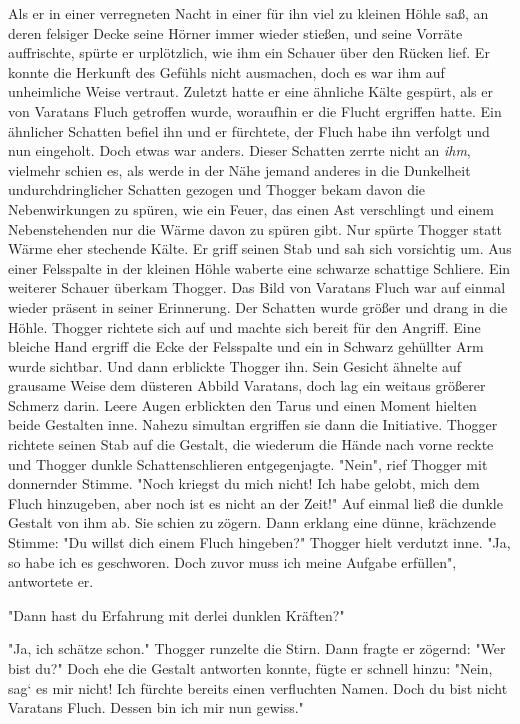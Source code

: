 \documentclass[10pt, a4paper, oneside]{book}
\begin{document}
\begin{multicols}{2}
Als er in einer verregneten Nacht in einer für ihn viel zu kleinen Höhle saß, an deren felsiger Decke seine Hörner immer wieder stießen, und seine Vorräte auffrischte, spürte er urplötzlich, wie ihm ein Schauer über den Rücken lief. Er konnte die Herkunft des Gefühls nicht ausmachen, doch es war ihm auf unheimliche Weise vertraut. Zuletzt hatte er eine ähnliche Kälte gespürt, als er von Varatans Fluch getroffen wurde, woraufhin er die Flucht ergriffen hatte. Ein ähnlicher Schatten befiel ihn und er fürchtete, der Fluch habe ihn verfolgt und nun eingeholt. Doch etwas war anders. Dieser Schatten zerrte nicht an \textit{ihm}, vielmehr schien es, als werde in der Nähe jemand anderes in die Dunkelheit undurchdringlicher Schatten gezogen und Thogger bekam davon die Nebenwirkungen zu spüren, wie ein Feuer, das einen Ast verschlingt und einem Nebenstehenden nur die Wärme davon zu spüren gibt. Nur spürte Thogger statt Wärme eher stechende Kälte. Er griff seinen Stab und sah sich vorsichtig um. Aus einer Felsspalte in der kleinen Höhle waberte eine schwarze schattige Schliere. Ein weiterer Schauer überkam Thogger. Das Bild von Varatans Fluch war auf einmal wieder präsent in seiner Erinnerung. Der Schatten wurde größer und drang in die Höhle. Thogger richtete sich auf und machte sich bereit für den Angriff. Eine bleiche Hand ergriff die Ecke der Felsspalte und ein in Schwarz gehüllter Arm wurde sichtbar. Und dann erblickte Thogger ihn. Sein Gesicht ähnelte auf grausame Weise dem düsteren Abbild Varatans, doch lag ein weitaus größerer Schmerz darin. Leere Augen erblickten den Tarus und einen Moment hielten beide Gestalten inne. Nahezu simultan ergriffen sie dann die Initiative. Thogger richtete seinen Stab auf die Gestalt, die wiederum die Hände nach vorne reckte und Thogger dunkle Schattenschlieren entgegenjagte. "Nein", rief Thogger mit donnernder Stimme. "Noch kriegst du mich nicht! Ich habe gelobt, mich dem Fluch hinzugeben, aber noch ist es nicht an der Zeit!" Auf einmal ließ die dunkle Gestalt von ihm ab. Sie schien zu zögern. Dann erklang eine dünne, krächzende Stimme: "Du willst dich einem Fluch hingeben?" Thogger hielt verdutzt inne. "Ja, so habe ich es geschworen. Doch zuvor muss ich meine Aufgabe erfüllen", antwortete er.\bigskip

"Dann hast du Erfahrung mit derlei dunklen Kräften?"\bigskip

"Ja, ich schätze schon." Thogger runzelte die Stirn. Dann fragte er zögernd: "Wer bist du?" Doch ehe die Gestalt antworten konnte, fügte er schnell hinzu: "Nein, sag‘ es mir nicht! Ich fürchte bereits einen verfluchten Namen. Doch du bist nicht Varatans Fluch. Dessen bin ich mir nun gewiss."\bigskip


\end{multicols}
\end{document}
